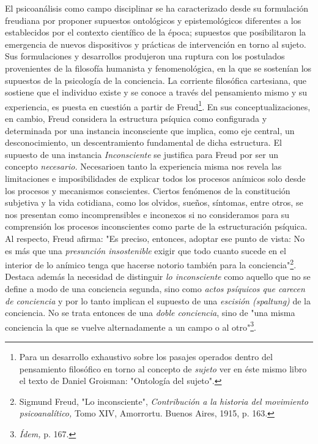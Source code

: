 El psicoanálisis como campo disciplinar se ha caracterizado desde su
formulación freudiana por proponer supuestos ontológicos y
epistemológicos diferentes a los establecidos por el contexto científico
de la época; supuestos que posibilitaron la emergencia de nuevos
dispositivos y prácticas de intervención en torno al sujeto. Sus
formulaciones y desarrollos produjeron una ruptura con los postulados
provenientes de la filosofía humanista y fenomenológica, en la que se
sostenían los supuestos de la psicología de la conciencia. La corriente
filosófica cartesiana, que sostiene que el individuo existe y se conoce
a través del pensamiento mismo y su experiencia, es puesta en cuestión a
partir de Freud\footnote{Para un desarrollo exhaustivo sobre los pasajes
  operados dentro del pensamiento filosófico en torno al concepto de
  \emph{sujeto} ver en éste mismo libro el texto de Daniel Groisman:
  "Ontología del sujeto".}. En sus conceptualizaciones, en cambio, Freud
considera la estructura psíquica como configurada y determinada por una
instancia inconsciente que implica, como eje central, un
desconocimiento, un descentramiento fundamental de dicha estructura. El
supuesto de una instancia \emph{Inconsciente} se justifica para Freud
por ser un concepto \emph{necesario.} Necesarioen tanto la experiencia
misma nos revela las limitaciones e imposibilidades de explicar todos
los procesos anímicos solo desde los procesos y mecanismos conscientes.
Ciertos fenómenos de la constitución subjetiva y la vida cotidiana, como
los olvidos, sueños, síntomas, entre otros, se nos presentan como
incomprensibles e inconexos si no consideramos para su comprensión los
procesos inconscientes como parte de la estructuración psíquica. Al
respecto, Freud afirma: "Es preciso, entonces, adoptar ese punto de
vista: No es más que una \emph{presunción insostenible} exigir que todo
cuanto sucede en el interior de lo anímico tenga que hacerse notorio
también para la conciencia"\footnote{Sigmund Freud, "Lo inconsciente",
  \emph{Contribución a la historia del movimiento psicoanalítico,} Tomo
  XIV, Amorrortu. Buenos Aires, 1915, p. 163.}. Destaca además la
necesidad de distinguir \emph{lo inconsciente} como aquello que no se
define a modo de una conciencia segunda, sino como \emph{actos psíquicos
que carecen de conciencia} y por lo tanto implican el supuesto de una
\emph{escisión (spaltung)} de la conciencia. No se trata entonces de una
\emph{doble conciencia}, sino de "una misma conciencia la que se vuelve
alternadamente a un campo o al otro"\footnote{\emph{Ídem,} p. 167.}.

